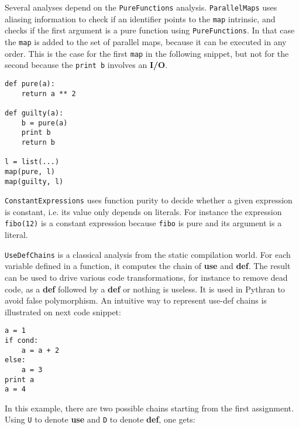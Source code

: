 \documentclass[10pt, onecolumn, preprint]{sigplanconf}
\begin{document}
Several analyses depend on the \texttt{PureFunctions} analysis.
\texttt{ParallelMaps} uses aliasing information to check if an identifier
points to the \texttt{map} intrinsic, and checks if the first argument is a
pure function using \texttt{PureFunctions}. In that case the \texttt{map} is
added to the set of parallel maps, because it can be executed in any order.
This is the case for the first \texttt{map} in the following snippet, but not
for the second because the \texttt{print b} involves an \textbf{I/O}.

\begin{lstlisting}
def pure(a):
    return a ** 2

def guilty(a):
    b = pure(a)
    print b
    return b

l = list(...)
map(pure, l)
map(guilty, l)
\end{lstlisting}

\texttt{ConstantExpressions} uses function purity to decide whether a given expression
is constant, i.e. its value only depends on literals. For instance the
expression \texttt{fibo(12)} is a constant expression because \texttt{fibo} is pure and its
argument is a literal.

\texttt{UseDefChains} is a classical analysis from the static compilation world. For
each variable defined in a function, it computes the chain of \textbf{use} and \textbf{def}.
The result can be used to drive various code transformations, for instance to
remove dead code, as a \textbf{def} followed by a \textbf{def} or nothing is useless. It is
used in Pythran to avoid false polymorphism. An intuitive way to represent
use-def chains is illustrated on next code snippet:

\begin{lstlisting}
a = 1
if cond:
    a = a + 2
else:
    a = 3
print a
a = 4
\end{lstlisting}

In this example, there are two possible chains starting from the first
assignment. Using \texttt{U} to denote \textbf{use} and \texttt{D} to denote \textbf{def}, one gets:

\begin{center}
\end{center}
\end{document}
